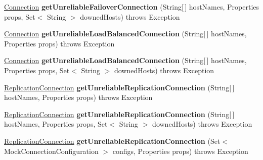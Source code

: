 \begin{DoxyCompactItemize}
\item 
\mbox{\label{classtestsuite_1_1_base_test_case_ae47036b912887e1198a33eeaf0dff29c}} 
\mbox{\hyperlink{interfacecom_1_1mysql_1_1jdbc_1_1_connection}{Connection}} {\bfseries get\+Unreliable\+Failover\+Connection} (String\mbox{[}$\,$\mbox{]} host\+Names, Properties props, Set$<$ String $>$ downed\+Hosts)  throws Exception 
\item 
\mbox{\label{classtestsuite_1_1_base_test_case_a81c482cdb87cc311d0ed83ff480594bf}} 
\mbox{\hyperlink{interfacecom_1_1mysql_1_1jdbc_1_1_connection}{Connection}} {\bfseries get\+Unreliable\+Load\+Balanced\+Connection} (String\mbox{[}$\,$\mbox{]} host\+Names, Properties props)  throws Exception 
\item 
\mbox{\label{classtestsuite_1_1_base_test_case_af1e7c3a34a87ab4a008843290942cdaa}} 
\mbox{\hyperlink{interfacecom_1_1mysql_1_1jdbc_1_1_connection}{Connection}} {\bfseries get\+Unreliable\+Load\+Balanced\+Connection} (String\mbox{[}$\,$\mbox{]} host\+Names, Properties props, Set$<$ String $>$ downed\+Hosts)  throws Exception 
\item 
\mbox{\label{classtestsuite_1_1_base_test_case_ad87384bfe06e3ddfbf89578316b176a2}} 
\mbox{\hyperlink{interfacecom_1_1mysql_1_1jdbc_1_1_replication_connection}{Replication\+Connection}} {\bfseries get\+Unreliable\+Replication\+Connection} (String\mbox{[}$\,$\mbox{]} host\+Names, Properties props)  throws Exception 
\item 
\mbox{\label{classtestsuite_1_1_base_test_case_add2c34fed4dd457540016f9d22a6fcb2}} 
\mbox{\hyperlink{interfacecom_1_1mysql_1_1jdbc_1_1_replication_connection}{Replication\+Connection}} {\bfseries get\+Unreliable\+Replication\+Connection} (String\mbox{[}$\,$\mbox{]} host\+Names, Properties props, Set$<$ String $>$ downed\+Hosts)  throws Exception 
\item 
\mbox{\label{classtestsuite_1_1_base_test_case_a343014aac2808c32fbadb0f42a22f77d}} 
\mbox{\hyperlink{interfacecom_1_1mysql_1_1jdbc_1_1_replication_connection}{Replication\+Connection}} {\bfseries get\+Unreliable\+Replication\+Connection} (Set$<$ Mock\+Connection\+Configuration $>$ configs, Properties props)  throws Exception 

\end{DoxyCompactItemize}
